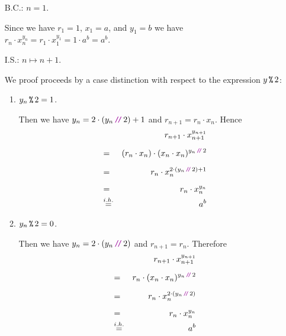 \begin{enumerate}
\item[B.C.:] $n=1$.

            Since we have $r_1 = 1$, $x_1 = a$, and $y_1 = b$ we have 
            \\[0.2cm]
            \hspace*{1.3cm}
            $r_n \cdot x_n^{y_n} = r_1 \cdot x_1^{y_1} = 1 \cdot a^{b} = a^b$.
\item[I.S.:] $n \mapsto n + 1$.

            We proof proceeds by a case distinction with respect to the expression $y \,\texttt{\%}\, 2$:
            \begin{enumerate}
            \item $y_n \,\texttt{\%}\, 2 = 1$.

                  Then we have $y_{n} = 2 \cdot (y_n\dv 2) + 1$ and
                  $r_{n+1} = r_n \cdot x_n$.  Hence
                  \begin{eqnarray*}
                      &   & r_{n+1} \cdot x_{n+1}^{y_{n+1}} \\[0.2cm] 
                      & = & (r_{n} \cdot x_n) \cdot (x_{n} \cdot x_{n})^{y_{n}\dvv 2} \\[0.2cm] 
                      & = & r_{n} \cdot x_n^{2 \cdot (y_{n}\dvv 2) + 1} \\[0.2cm] 
                      & = & r_{n} \cdot x_n^{y_n} \\
                      & \stackrel{i.h.}{=} & a^{b} 
                  \end{eqnarray*}

            \item $y_n \,\texttt{\%}\, 2 = 0$.

                  Then we have $y_{n} = 2 \cdot (y_n\dv 2)$ and $r_{n+1} = r_n$.
                  Therefore
                  \begin{eqnarray*}
                      &   & r_{n+1} \cdot x_{n+1}^{y_{n+1}} \\[0.2cm] 
                      & = & r_{n} \cdot (x_{n} \cdot x_{n})^{y_{n}\dvv 2} \\[0.2cm] 
                      & = & r_{n} \cdot x_n^{2 \cdot (y_{n} \dvv 2)} \\[0.2cm] 
                      & = & r_{n} \cdot x_n^{y_n} \\
                      & \stackrel{i.h.}{=} & a^{b} 
                  \end{eqnarray*}
            \end{enumerate}
\end{enumerate}
